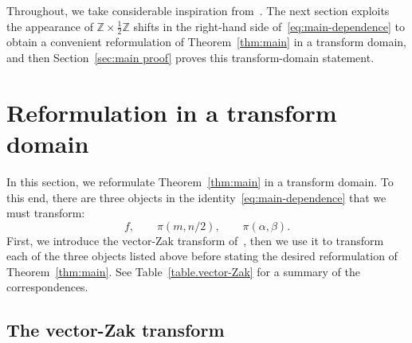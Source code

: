\documentclass[10pt,a4paper]{amsart}
\newcommand{\Z}{\mathbb{Z}}
\begin{document}
Throughout, we take considerable inspiration from~\cite{FaulhuberPvC:26}.
The next section exploits the appearance of $\Z\times\tfrac12\Z$ shifts in the right-hand side of~\eqref{eq:main-dependence} to obtain a convenient reformulation of Theorem~\ref{thm:main} in a transform domain, and then 
Section~\ref{sec:main proof} proves this transform-domain statement.

\section{Reformulation in a transform domain}

In this section, we reformulate Theorem~\ref{thm:main} in a transform domain.
To this end, there are three objects in the identity~\eqref{eq:main-dependence} that we must transform:
\[
f,
\qquad
\pi(m,n/2),
\qquad
\pi(\alpha,\beta).
\]
First, we introduce the vector-Zak transform of~\cite{FaulhuberPvC:26}, then we use it to transform each of the three objects listed above before stating the desired reformulation of Theorem~\ref{thm:main}.
See Table~\ref{table.vector-Zak} for a summary of the correspondences.

\subsection{The vector-Zak transform}
\end{document}

